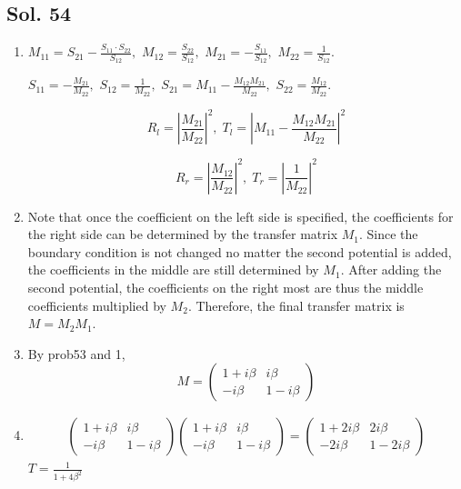 \subsection*{Sol. 54}
\begin{enumerate}
    \item 
    $M_{11}=S_{21}-
    \frac{S_{11}\cdot S_{22}}{S_{12}},$ 
    $M_{12}=\frac{S_{22}}{S_{12}},$
    $M_{21}=-\frac{S_{11}}{S_{12}},$
    $M_{22}=\frac{1}{S_{12}}.$

    $S_{11}=-\frac{M_{21}}{M_{22}},$ 
    $S_{12}=\frac{1}{M_{22}},$
    $S_{21}=M_{11}-\frac{M_{12}M_{21}}{M_{22}},$
    $S_{22}=\frac{M_{12}}{M_{22}}.$

    $$
    R_l=\left|\frac{M_{21}}{M_{22}}\right|^2,
    \;
    T_l=\left|M_{11}-\frac{M_{12}M_{21}}{M_{22}}\right|^2
    $$
    
    $$
    R_r=\left|\frac{M_{12}}{M_{22}}\right|^2,
    \;
    T_r=\left|\frac{1}{M_{22}}\right|^2
    $$

    \item Note that once the coefficient on the left side is specified, the coefficients for the right side can be determined by the transfer matrix $M_1.$ Since the boundary condition is not changed no matter the second potential is added, the coefficients in the middle are still determined by $M_1.$ After adding the second potential, the coefficients on the right most are thus the middle coefficients multiplied by $M_2.$ Therefore, the final transfer matrix is $M=M_2M_1.$
    \item By prob53 and 1,
    $$
    M=\begin{pmatrix}
        1+i\beta
        & i\beta\\
        -i\beta & 1-i\beta
    \end{pmatrix}
    $$
    \item 
    \begin{align*}
       \begin{pmatrix}
        1+i\beta
        & i\beta\\
        -i\beta & 1-i\beta
    \end{pmatrix}
    \begin{pmatrix}
        1+i\beta
        & i\beta\\
        -i\beta & 1-i\beta
    \end{pmatrix}
    =
    \begin{pmatrix}
        1+2i\beta
        & 2i\beta\\
        -2i\beta & 1-2i\beta
    \end{pmatrix}
    \end{align*}
    $T=\frac{1}{1+4\beta^2}$
\end{enumerate}


